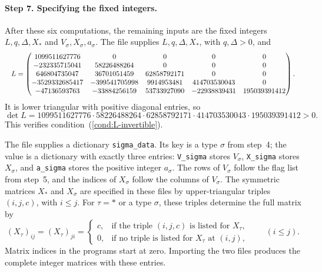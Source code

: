 \documentclass[11pt]{article}
\begin{document}
\paragraph{Step 7. Specifying the fixed integers.}
After these six computations, the remaining inputs are the fixed integers
$L,q,\Delta,X_*$ and $V_\sigma,X_\sigma,a_\sigma$.
The file \href{https://github.com/Diudiutse/triangle-free-signless-laplacian/blob/main/programs/spectral_data.py}{} supplies $L,q,\Delta,X_*$, with
$q,\Delta>0$, and
\[
\resizebox{\textwidth}{!}{$
L=\begin{pmatrix}
1099511627776&0&0&0&0\\
-232335715041&58226488264&0&0&0\\
646804735047&36701051459&62858792171&0&0\\
-3529332685417&-399541705998&9914953481&414703530043&0\\
-47136593763&-33884256159&53733927090&-22938839431&195039391412
\end{pmatrix}.
$}
\]
It is lower triangular with positive diagonal entries, so
\[
\det L=
1099511627776\cdot58226488264\cdot62858792171
\cdot414703530043\cdot195039391412>0.
\]
This verifies condition~(\ref{cond:L-invertible}).

The file \href{https://github.com/Diudiutse/triangle-free-signless-laplacian/blob/main/programs/sigma_data.py}{} supplies a dictionary \texttt{sigma\_data}.
Its key is a type $\sigma$ from step~4; the value is a dictionary with
exactly three entries:
\texttt{V\_sigma} stores $V_\sigma$, \texttt{X\_sigma} stores $X_\sigma$,
and \texttt{a\_sigma} stores the positive integer $a_\sigma$.
The rows of $V_\sigma$ follow the flag list from step~5, and the indices
of $X_\sigma$ follow the columns of $V_\sigma$.
The symmetric matrices $X_*$ and $X_\sigma$ are specified in these files
by upper-triangular triples $(i,j,c)$, with $i\leq j$.
For $\tau=*$ or a type $\sigma$, these triples determine the full matrix by
\begin{equation}\label{eq:correction-entries}
(X_\tau)_{ij}=(X_\tau)_{ji}=
\begin{cases}
c,&\text{if the triple }(i,j,c)\text{ is listed for }X_\tau,\\
0,&\text{if no triple is listed for }X_\tau\text{ at }(i,j),
\end{cases}
\qquad(i\leq j).
\end{equation}
Matrix indices in the programs start at zero.
Importing the two files produces the complete integer matrices with these entries.
\end{document}
